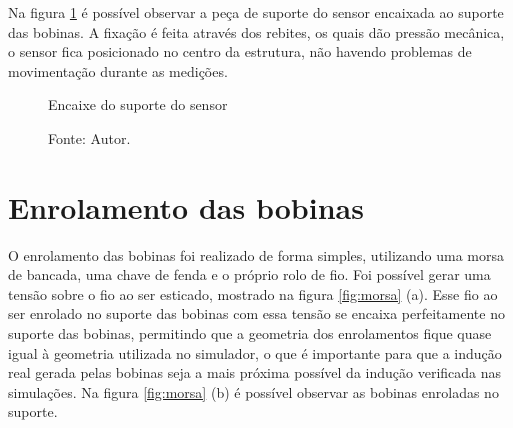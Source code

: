Na figura \ref{fig:sensup} é possível observar a peça de suporte do sensor encaixada ao suporte das bobinas. A fixação é feita através dos rebites, os quais dão pressão mecânica, o sensor fica posicionado no centro da estrutura, não havendo problemas de movimentação durante as medições.

\begin{figure}[H]
    \centering
     \caption{Encaixe do suporte do sensor}
     \caption*{Fonte: Autor.}\label{fig:sensup}
\end{figure}


\section{Enrolamento das bobinas}

O enrolamento das bobinas foi realizado de forma simples, utilizando uma morsa de bancada, uma chave de fenda e o próprio rolo de fio. Foi possível gerar uma tensão sobre o fio ao ser esticado, mostrado na figura \ref{fig:morsa} (a). Esse fio ao ser enrolado no suporte das bobinas com essa tensão se encaixa perfeitamente no suporte das bobinas, permitindo que a geometria dos enrolamentos fique quase igual à geometria utilizada no simulador, o que é importante para que a indução real gerada pelas bobinas seja a mais próxima possível da indução verificada nas simulações. Na figura \ref{fig:morsa} (b) é possível observar as bobinas enroladas no suporte.

